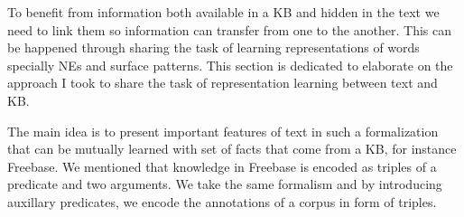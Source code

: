 To benefit from information both available in a KB and hidden in the text we
need to link them so information can transfer from one to the another. This can
be happened through sharing the task of learning representations of words
specially NEs and surface patterns. This section is dedicated to elaborate on
the approach I took to share the task of representation learning between text
and KB.

The main idea is to present important features of text in such a formalization
that can be mutually learned with set of facts that come from a KB, for instance
Freebase. We mentioned that knowledge in Freebase is encoded as triples of a
predicate and two arguments. We take the same formalism and by introducing
auxillary predicates, we encode the annotations of a corpus in form of triples.

